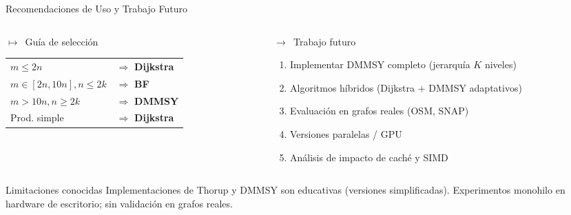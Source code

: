 \documentclass[aspectratio=169,12pt]{beamer}
\begin{document}
\begin{frame}{Recomendaciones de Uso y Trabajo Futuro}
  {\small
  \begin{columns}[T]
    \begin{column}{0.48\textwidth}
      \begin{block}{$\mapsto$~Guía de selección}
        \begin{tabular}{@{}ll@{}}
          $m \leq 2n$ & $\Rightarrow$ \textbf{Dijkstra}\\[2pt]
          $m \in [2n,10n], n\!\leq\!2k$ & $\Rightarrow$ \textbf{BF}\\[2pt]
          $m > 10n, n\!\geq\!2k$ & $\Rightarrow$ \textbf{DMMSY}\\[2pt]
          Prod. simple & $\Rightarrow$ \textbf{Dijkstra}\\
        \end{tabular}
      \end{block}
    \end{column}
    \begin{column}{0.48\textwidth}
      \begin{exampleblock}{$\rightarrow$~Trabajo futuro}
        \begin{enumerate}\tiny
          \item Implementar DMMSY completo (jerarquía $K$ niveles)
          \item Algoritmos híbridos (Dijkstra + DMMSY adaptativos)
          \item Evaluación en grafos reales (OSM, SNAP)
          \item Versiones paralelas / GPU
          \item Análisis de impacto de caché y SIMD
        \end{enumerate}
      \end{exampleblock}
    \end{column}
  \end{columns}
  \vspace{0.25cm}
  \begin{alertblock}{\tiny Limitaciones conocidas}
    Implementaciones de Thorup y DMMSY son educativas (versiones simplificadas).
    Experimentos monohilo en hardware de escritorio; sin validación en grafos reales.
  \end{alertblock}
  }
\end{frame}
\end{document}
